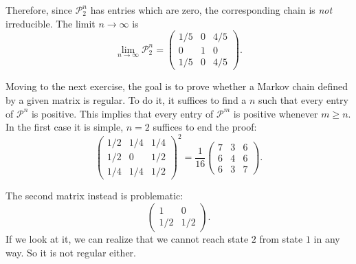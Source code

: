 Therefore, since $\mathcal{P}_{2}^{n}$ has entries which are zero, the
corresponding chain is \emph{not} irreducible. The limit $n \to \infty$ is
\begin{equation}
    \lim_{n \to \infty} \mathcal{P}_{2}^{n} =
    \begin{pmatrix}
        1/5 & 0 & 4/5 \\
        0 & 1 & 0 \\
        1/5 & 0 & 4/5
    \end{pmatrix}.
\end{equation}

Moving to the next exercise, the goal is to prove whether a Markov chain defined
by a given matrix is regular. To do it, it suffices to find a $n$ such that
every entry of $\mathcal{P}^{n}$ is positive. This implies that every entry of
$\mathcal{P}^{m}$ is positive whenever $m \geq n$. In the first case it is
simple, $n = 2$ suffices to end the proof:
\begin{equation}
    \begin{pmatrix}
        1/2 & 1/4 & 1/4 \\
        1/2 &  0  & 1/2 \\
        1/4 & 1/4 & 1/2
    \end{pmatrix}^2
    = \frac{1}{16}
    \begin{pmatrix}
        7 & 3 & 6 \\
        6 & 4 & 6 \\
        6 & 3 & 7
    \end{pmatrix}.
\end{equation}

The second matrix instead is problematic:
\begin{equation}
    \begin{pmatrix}
        1 & 0 \\
        1/2 & 1/2
    \end{pmatrix}.
\end{equation}
If we look at it, we can realize that we cannot reach state $2$ from state $1$
in any way. So it is not regular either.
